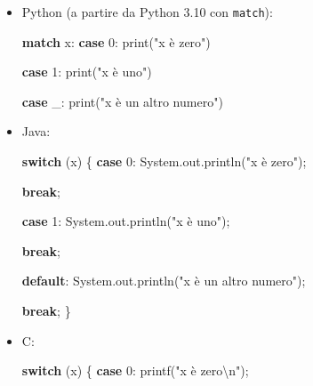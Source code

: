 \documentclass[
  letterpaper,
]{scrbook}
\newenvironment{Shaded}{\begin{snugshade}}{\end{snugshade}}
\newcommand{\BuiltInTok}[1]{\textcolor[rgb]{0.00,0.23,0.31}{#1}}
\newcommand{\ControlFlowTok}[1]{\textcolor[rgb]{0.00,0.23,0.31}{\textbf{#1}}}
\newcommand{\DecValTok}[1]{\textcolor[rgb]{0.68,0.00,0.00}{#1}}
\newcommand{\FunctionTok}[1]{\textcolor[rgb]{0.28,0.35,0.67}{#1}}
\newcommand{\KeywordTok}[1]{\textcolor[rgb]{0.00,0.23,0.31}{\textbf{#1}}}
\newcommand{\NormalTok}[1]{\textcolor[rgb]{0.00,0.23,0.31}{#1}}
\newcommand{\OperatorTok}[1]{\textcolor[rgb]{0.37,0.37,0.37}{#1}}
\newcommand{\SpecialCharTok}[1]{\textcolor[rgb]{0.37,0.37,0.37}{#1}}
\newcommand{\StringTok}[1]{\textcolor[rgb]{0.13,0.47,0.30}{#1}}
\begin{document}
\begin{itemize}
  \begin{itemize}
  \item
    Python (a partire da Python 3.10 con \texttt{match}):

\begin{Shaded}
\begin{Highlighting}[]
\ControlFlowTok{match}\NormalTok{ x:}
  \ControlFlowTok{case} \DecValTok{0}\NormalTok{:}
    \BuiltInTok{print}\NormalTok{(}\StringTok{"x è zero"}\NormalTok{)}

  \ControlFlowTok{case} \DecValTok{1}\NormalTok{:}
    \BuiltInTok{print}\NormalTok{(}\StringTok{"x è uno"}\NormalTok{)}

  \ControlFlowTok{case}\NormalTok{ \_:}
    \BuiltInTok{print}\NormalTok{(}\StringTok{"x è un altro numero"}\NormalTok{)}
\end{Highlighting}
\end{Shaded}
  \item
    Java:

\begin{Shaded}
\begin{Highlighting}[]
\ControlFlowTok{switch} \OperatorTok{(}\NormalTok{x}\OperatorTok{)} \OperatorTok{\{}
  \ControlFlowTok{case} \DecValTok{0}\OperatorTok{:}
    \BuiltInTok{System}\OperatorTok{.}\FunctionTok{out}\OperatorTok{.}\FunctionTok{println}\OperatorTok{(}\StringTok{"x è zero"}\OperatorTok{);}

    \ControlFlowTok{break}\OperatorTok{;}

  \ControlFlowTok{case} \DecValTok{1}\OperatorTok{:}
    \BuiltInTok{System}\OperatorTok{.}\FunctionTok{out}\OperatorTok{.}\FunctionTok{println}\OperatorTok{(}\StringTok{"x è uno"}\OperatorTok{);}

    \ControlFlowTok{break}\OperatorTok{;}

  \KeywordTok{default}\OperatorTok{:}
    \BuiltInTok{System}\OperatorTok{.}\FunctionTok{out}\OperatorTok{.}\FunctionTok{println}\OperatorTok{(}\StringTok{"x è un altro numero"}\OperatorTok{);}

    \ControlFlowTok{break}\OperatorTok{;}
\OperatorTok{\}}
\end{Highlighting}
\end{Shaded}
  \item
    C:

\begin{Shaded}
\begin{Highlighting}[]
\ControlFlowTok{switch} \OperatorTok{(}\NormalTok{x}\OperatorTok{)} \OperatorTok{\{}
  \ControlFlowTok{case} \DecValTok{0}\OperatorTok{:}
\NormalTok{    printf}\OperatorTok{(}\StringTok{"x è zero}\SpecialCharTok{\textbackslash{}n}\StringTok{"}\OperatorTok{);}


\end{Highlighting}
\end{Shaded}
\end{itemize}
\end{itemize}
\end{document}
